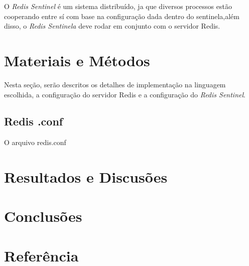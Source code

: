 \documentclass[10pt]{IEEEtran}
\begin{document}
O \textit{Redis Sentinel} é um sistema distribuído, ja que diversos processos estão cooperando entre sí com base na configuração dada dentro do sentinela,além disso, o \textit{Redis Sentinela} deve rodar em conjunto com o servidor Redis.

\section{Materiais e Métodos}
Nesta seção, serão descritos os detalhes de implementação na linguagem escolhida, a configuração do servidor Redis e a configuração do \textit{Redis Sentinel}.

\subsection{Redis .conf}

O arquivo redis.conf

\section{Resultados e Discusões}
\section{Conclusões}
\section{Referência}
\end{document}
